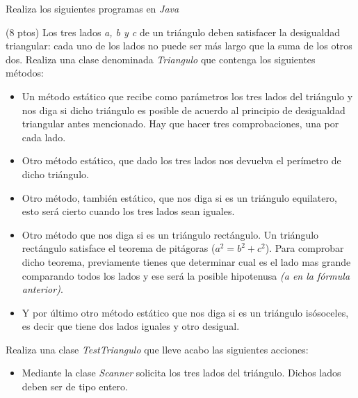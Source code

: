 \documentclass[addpoints,12pt]{exam}
\begin{document}
\begin{center}
\end{center}
\vspace{0.1in}
Realiza los siguientes programas en \emph{Java}
\begin{questions}
\question(8 ptos) Los tres lados \emph{a, b y c} de un triángulo deben satisfacer la desigualdad triangular: cada uno de los lados no puede ser más largo que la suma de los otros dos. Realiza una clase denominada \emph{Triangulo} que contenga los siguientes métodos:
\begin{itemize}
\item Un método estático que recibe como parámetros los tres lados del triángulo y nos diga si dicho triángulo es posible de acuerdo al principio de desigualdad triangular antes mencionado. Hay que hacer tres comprobaciones, una por cada lado.
\item Otro método estático, que dado los tres lados nos devuelva el perímetro de dicho triángulo.
\item Otro método, también estático, que nos diga si es un triángulo equilatero, esto será cierto cuando los tres lados sean iguales.
\item Otro método que nos diga si es un triángulo rectángulo. Un triángulo rectángulo satisface el teorema de pitágoras ($a^2 = b^2 + c^2$). Para comprobar dicho teorema, previamente tienes que determinar cual es el lado mas grande comparando todos los lados y ese será la posible hipotenusa \emph{(a en la fórmula anterior)}.
\item Y por último otro método estático que nos diga si es un triángulo isósoceles, es decir que tiene dos lados iguales y otro desigual.
\end{itemize}
Realiza una clase \emph{TestTriangulo} que lleve acabo las siguientes acciones:
\begin{itemize}
\item Mediante la clase \emph{Scanner} solicita los tres lados del triángulo. Dichos lados deben ser de tipo entero.

\end{itemize}
\end{questions}
\end{document}
